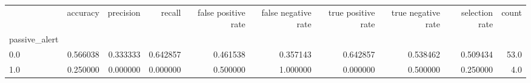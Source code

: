 \begin{tabular}{lrrrrrrrrr}
\toprule
{} &  accuracy &  precision &    recall &  false positive rate &  false negative rate &  true positive rate &  true negative rate &  selection rate &  count \\
passive\_alert &           &            &           &                      &                      &                     &                     &                 &        \\
\midrule
0.0           &  0.566038 &   0.333333 &  0.642857 &             0.461538 &             0.357143 &            0.642857 &            0.538462 &        0.509434 &   53.0 \\
1.0           &  0.250000 &   0.000000 &  0.000000 &             0.500000 &             1.000000 &            0.000000 &            0.500000 &        0.250000 &    4.0 \\
\bottomrule
\end{tabular}
